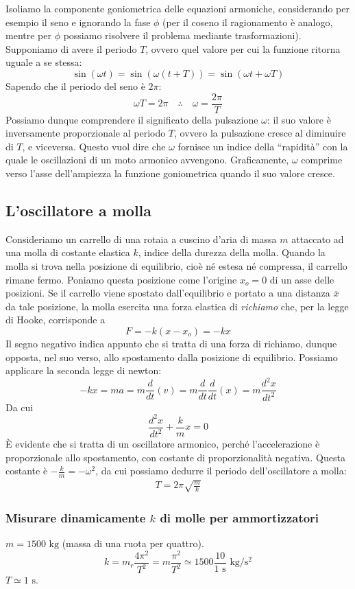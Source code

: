 Isoliamo la componente goniometrica delle equazioni armoniche, considerando
per esempio il seno e ignorando la fase $\phi$ (per il coseno il ragionamento
è analogo, mentre per $\phi$ possiamo risolvere il problema mediante trasformazioni).
Supponiamo di avere il periodo $T$, ovvero quel valore per cui la funzione ritorna
uguale a se stessa:
\[ \sin(\omega t) = \sin(\omega(t + T)) = \sin(\omega t + \omega T) \]
Sapendo che il periodo del seno è $2\pi$:
\[ \omega T = 2\pi \quad \therefore \quad \omega = \frac{2\pi}{T} \]
Possiamo dunque comprendere il significato della pulsazione $\omega$:
il suo valore è inversamente proporzionale al periodo $T$, ovvero la
pulsazione cresce al diminuire di $T$, e viceversa. Questo vuol dire
che $\omega$ fornisce un indice della ``rapidità'' con la quale le
oscillazioni di un moto armonico avvengono. Graficamente, $\omega$
comprime verso l'asse dell'ampiezza la funzione goniometrica quando il suo
valore cresce.

\subsection{L'oscillatore a molla}
Consideriamo un carrello di una rotaia a cuscino d'aria di massa $m$ attaccato
ad una molla di costante elastica $k$, indice della durezza della molla. Quando la molla si trova nella
posizione di equilibrio, cioè né estesa né compressa, il carrello rimane
fermo. Poniamo questa posizione come l'origine $x_o = 0$ di un asse delle
posizioni. Se il carrello viene spostato dall'equilibrio e portato a una
distanza $\overline{x}$ da tale posizione, la molla esercita una forza
elastica di \textit{richiamo} che, per la legge di Hooke, corrisponde a
\[ F = -k(x - x_o) = -kx \]
Il segno negativo indica appunto che si tratta di una forza di richiamo,
dunque opposta, nel suo verso, allo spostamento dalla posizione di equilibrio.
Possiamo applicare la seconda legge di newton:
\[ -kx = ma = m\frac{d}{dt}(v) = m\frac{d}{dt}\frac{d}{dt}(x) = m\frac{d^2x}{dt^2} \]
Da cui
\[ \frac{d^2x}{dt^2} + \frac{k}{m}x = 0 \]
È evidente che si tratta di un oscillatore armonico, perché l'accelerazione
è proporzionale allo spostamento, con costante di proporzionalità negativa.
Questa costante è $-\frac{k}{m} = -\omega^2$, da cui possiamo dedurre il
periodo dell'oscillatore a molla:
\begin{align}
    T = 2\pi\sqrt{\frac{m}{k}}
\end{align}

\subsubsection*{Misurare dinamicamente $k$ di molle per ammortizzatori}
$m = 1500\text{ kg}$ (massa di una ruota per quattro).
\[ k = m_r\frac{4\pi^2}{T^2} = m\frac{\pi^2}{T^2} \simeq 1500\frac{10}{1\text{ s}}\text{ kg/s$^2$}\]
$T \simeq 1\text{ s}$.



